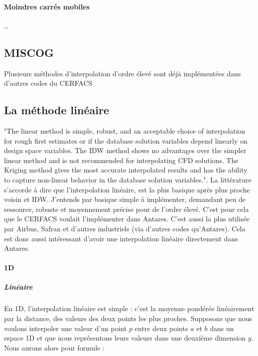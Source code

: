\paragraph{Moindres carrés mobiles}
\vspace{0.5cm}
\dots


\subsection{MISCOG}

Plusieurs méthodes d'interpolation d'ordre élevé sont déjà implémentées dans d'autres codes du CERFACS\cite{laborderie2018}

\subsection{La méthode linéaire}
"The linear method is simple, robust, and an acceptable choice of interpolation for rough first estimates or if the database solution variables depend linearly on design space variables. The IDW method shows no advantages over the simpler linear method and is not recommended for interpolating CFD solutions. The Kriging method gives the most accurate interpolated results and has the ability to capture non-linear behavior in the database solution variables."\cite{palmer2009}.
La littérature\cite{fluidssengineer} s'accorde à dire que l'interpolation linéaire, est la plus basique après plus proche voisin et IDW. J'entends par basique simple à implémenter, demandant peu de ressource, robuste et moyennement précise pour de l'ordre élevé. C'est pour cela que le CERFACS voulait l'implémenter dans Antares. C'est aussi la plus utilisée par Airbus, Safran et d'autres industriels (via d'autres codes qu'Antares). Cela est donc aussi intéressant d'avoir une interpolation linéaire directement dans Antares.


\paragraph{1D}
\subparagraph{Linéaire}

En 1D, l'interpolation linéaire est simple : c'est la moyenne pondérée linéairement par la distance, des valeurs des deux points les plus proches.
Supposons que nous voulons interpoler une valeur d'un point \( p \) entre deux points \( a \) et \( b \) dans un espace 1D
et que nous représentons leurs valeurs dans une deuxième dimension \( y \).
Nous aurons alors pour formule :

